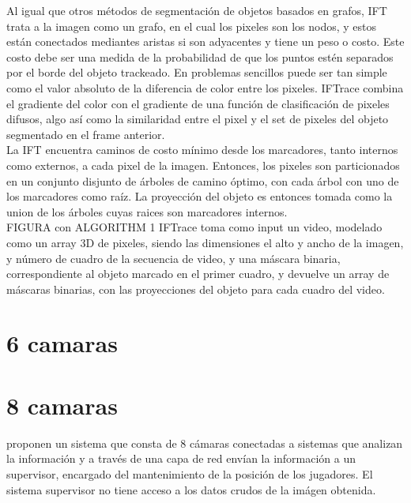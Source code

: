\documentclass[a4paper,10pt]{article}
\begin{document}
Al igual que otros métodos de segmentación de objetos basados en grafos, IFT trata a la imagen como un grafo, en el cual los pixeles son los nodos, y
estos están conectados mediantes aristas si son adyacentes y tiene un peso o costo. Este costo debe ser una medida de la probabilidad de que 
los puntos estén separados por el borde del objeto trackeado. En problemas sencillos puede ser tan simple como el valor absoluto de la diferencia de color 
entre los pixeles. IFTrace combina el gradiente del color con el gradiente de una función de clasificación de pixeles difusos, algo así como la similaridad entre el pixel 
y el set de pixeles del objeto segmentado en el frame anterior. \\

La IFT encuentra caminos de costo mínimo desde los marcadores, tanto internos como externos, a cada pixel de la imagen. Entonces, los pixeles son particionados en un conjunto
disjunto de árboles de camino óptimo, con cada árbol con uno de los marcadores como raíz. La proyección del objeto es entonces tomada como la union de los árboles cuyas raices 
son marcadores internos.\\


FIGURA con ALGORITHM 1
IFTrace toma como input un video, modelado como un array 3D de pixeles, siendo las dimensiones el alto y ancho de la imagen, y número de cuadro de la secuencia de video, y una 
máscara binaria, correspondiente al objeto marcado en el primer cuadro, y devuelve un array de máscaras binarias, con las proyecciones del objeto para cada cuadro del video.

\section{6 camaras}


\section{8 camaras}

\citeauthor*{xu-8cams} proponen un sistema que consta de 8 cámaras conectadas a sistemas que 
analizan la información y a través de una capa de red envían la información a un supervisor,
encargado del mantenimiento de la posición de los jugadores. El sistema supervisor no tiene 
acceso a los datos crudos de la imágen obtenida.
\end{document}
